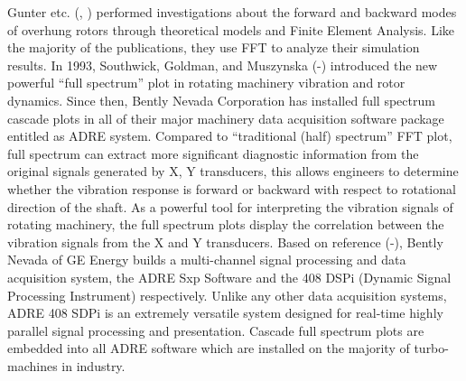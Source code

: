 		Gunter etc. (\cite{Gunter}, \cite{Gunter 93}) performed investigations about the forward and backward modes of overhung rotors through theoretical models and Finite Element Analysis. Like the majority of the publications, they use FFT to analyze their simulation results. In 1993, Southwick, Goldman, and Muszynska (\cite{Goldman}-\cite{Southwick 94}) introduced the new powerful “full spectrum” plot in rotating machinery vibration and rotor dynamics. Since then, Bently Nevada Corporation has installed full spectrum cascade plots in all of their major machinery data acquisition software package entitled as ADRE system. Compared to “traditional (half) spectrum” FFT plot, full spectrum can extract more significant diagnostic information from the original signals generated by X, Y transducers, this allows engineers to determine whether the vibration response is forward or backward with respect to rotational direction of the shaft. As a powerful tool for interpreting the vibration signals of rotating machinery, the full spectrum plots display the correlation between the vibration signals from the X and Y transducers. Based on reference (\cite{Bently}-\cite{Southwick 94}), Bently Nevada of GE Energy builds a multi-channel signal processing and data acquisition system, the ADRE Sxp Software and the 408 DSPi (Dynamic Signal Processing Instrument) respectively. Unlike any other data acquisition systems, ADRE 408 SDPi is an extremely versatile system designed for real-time highly parallel signal processing and presentation. Cascade full spectrum plots are embedded into all ADRE software which are installed on the majority of turbo-machines in industry.
		\par
